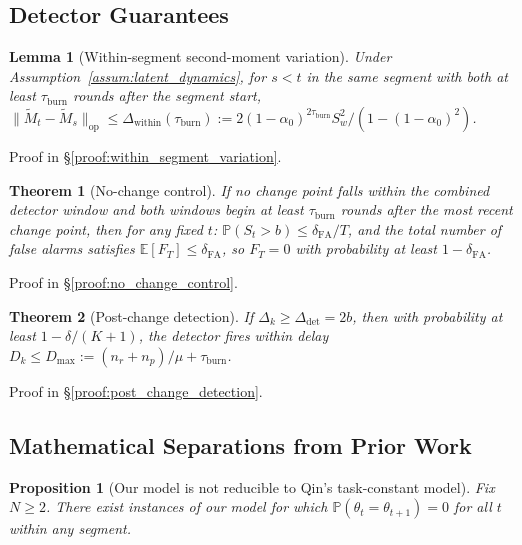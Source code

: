 \documentclass{article}
\newcommand{\E}{\mathbb{E}}
\newcommand{\Prob}{\mathbb{P}}
\newcommand{\op}{\mathrm{op}}
\newtheorem{lemma}{Lemma}
\newtheorem{theorem}{Theorem}
\newtheorem{proposition}{Proposition}
\begin{document}
\subsection{Detector Guarantees}
\label{app:detector_guarantees}

\begin{lemma}[Within-segment second-moment variation]
\label{lem:within_segment_variation}
Under Assumption~\ref{assum:latent_dynamics}, for $s < t$ in the same segment with both at least $\tau_{\mathrm{burn}}$ rounds after the segment start,
$\|\widetilde M_t - \widetilde M_s\|_{\op} \le \Delta_{\mathrm{within}}(\tau_{\mathrm{burn}}) := 2(1-\alpha_0)^{2\tau_{\mathrm{burn}}} S_w^2/(1-(1-\alpha_0)^2)$.
\end{lemma}

Proof in \S\ref{proof:within_segment_variation}.

\begin{theorem}[No-change control]
\label{thm:no_change_control}
If no change point falls within the combined detector window and both windows begin at least $\tau_{\mathrm{burn}}$ rounds after the most recent change point, then for any fixed $t$:
$\Prob(S_t > b) \le \delta_{\mathrm{FA}}/T$,
and the total number of false alarms satisfies $\E[F_T] \le \delta_{\mathrm{FA}}$, so $F_T = 0$ with probability at least $1 - \delta_{\mathrm{FA}}$.
\end{theorem}

Proof in \S\ref{proof:no_change_control}.

\begin{theorem}[Post-change detection]
\label{thm:post_change_detection}
If $\Delta_k \ge \Delta_{\mathrm{det}} = 2b$, then with probability at least $1 - \delta/(K+1)$, the detector fires within delay $D_k \le D_{\max} := (n_r + n_p)/\mu + \tau_{\mathrm{burn}}$.
\end{theorem}

Proof in \S\ref{proof:post_change_detection}.

\subsection{Mathematical Separations from Prior Work}
\label{app:separation}

\begin{proposition}[Our model is not reducible to Qin's task-constant model]
\label{prop:separation_qin_1}
Fix $N\ge 2$. There exist instances of our model for which $\Prob(\theta_t = \theta_{t+1}) = 0$ for all $t$ within any segment.
\end{proposition}
\end{document}
